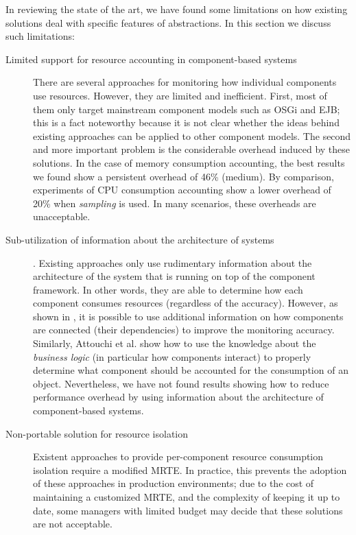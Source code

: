 In reviewing the state of the art, we have found some limitations on how existing solutions deal with specific features of abstractions.
In this section we discuss such limitations:


\begin{description}

\item[Limited support for resource accounting in component-based systems] There are several approaches for monitoring how individual components use resources.
However, they are limited and inefficient.
First, most of them only target mainstream component models such as OSGi and EJB; this is a fact noteworthy because it is not clear whether the ideas behind existing approaches can be applied to other component models.
The second and more important problem is the considerable overhead induced by these solutions.
In the case of memory consumption accounting, the best results we found show a persistent overhead of 46\% (medium).
By comparison, experiments of CPU consumption accounting show a lower overhead of 20\% when \textit{sampling} is used.
In many scenarios, these overheads are unacceptable. 

\item[Sub-utilization of information about the architecture of systems].
Existing approaches only use rudimentary information about the architecture of the system that is running on top of the component framework.
In other words, they are able to determine how each component consumes resources (regardless of the accuracy).
However, as shown in \cite{Maurel:2012:AME:2304736.2304763}, it is possible to use additional information on how components are connected (their dependencies) to improve the monitoring accuracy.
Similarly, Attouchi et al. \cite{Attouchi:2014:MMM:2602458.2602467} show how to use the knowledge about the \textit{business logic} (in particular how components interact) to properly determine what component should be accounted for the consumption of an object.
Nevertheless, we have not found results showing how to reduce performance overhead by using information about the architecture of component-based systems. 


\item[Non-portable solution for resource isolation] Existent approaches to provide per-component resource consumption isolation require a modified MRTE.
In practice, this prevents the adoption of these approaches in production environments; due to the cost of maintaining a customized MRTE, and the complexity of keeping it up to date, some managers with limited budget may decide that these solutions are not acceptable.


\end{description}
